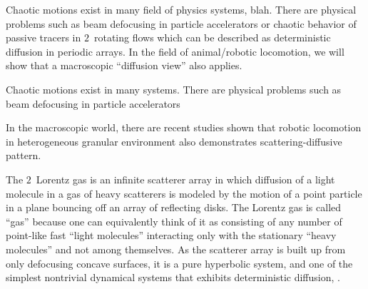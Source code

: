 Chaotic motions exist in many field of physics systems, blah. There are
physical problems such as beam defocusing in particle accelerators or
chaotic behavior of passive tracers in $2$\dmn\ rotating flows which can
be described as deterministic diffusion in periodic arrays. In the field
of animal/robotic locomotion, we will show that a macroscopic ``diffusion
view'' also applies.

Chaotic motions exist in many systems. There are physical problems such
as beam defocusing in particle accelerators 

In the macroscopic world, there are recent
studies shown that robotic locomotion in heterogeneous granular
environment also demonstrates scattering-diffusive pattern.



The $2$\dmn\ Lorentz gas is an infinite scatterer array in which
diffusion of a light molecule in a gas of heavy scatterers is modeled by
the motion of a point particle in a plane bouncing off an array of
reflecting disks. The Lorentz gas is called ``gas'' because one can
equivalently think of it as consisting of any number of point-like fast
``light molecules'' interacting only with the stationary ``heavy
molecules'' and not among themselves.  As the scatterer array is built up
from only defocusing concave surfaces, it is a pure hyperbolic system,
and one of the simplest nontrivial dynamical systems that exhibits
deterministic diffusion, .

